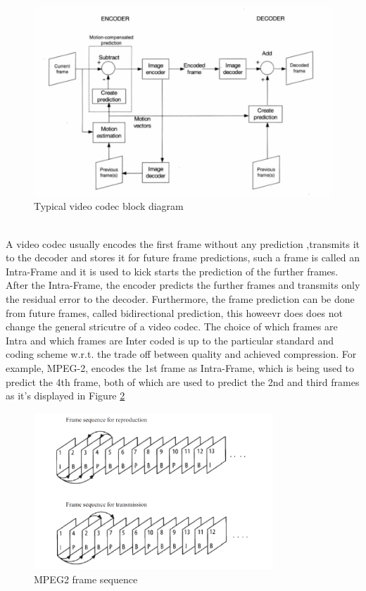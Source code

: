 \documentclass[a4paper,11pt,oneside]{article}
\begin{document}
\begin{figure}[h]
  \centering
  \includegraphics[width=\textwidth]{../figures/f1_codec_block_diagram.pdf}
  \caption{Typical video codec block diagram\cite[p.~44]{richardson2002video}}
  \label{figure:codec_block_diagram}
\end{figure} \\
A video codec usually encodes the first frame without any prediction ,transmits it to the decoder and stores it for future frame predictions, such a frame is called an Intra-Frame and it is used to kick starts the prediction of the further frames. After the Intra-Frame, the encoder predicts the further frames and transmits only the residual error to the decoder. Furthermore, the frame prediction can be done from future frames, called bidirectional prediction, this howeevr does does not change the general stricutre of a video codec. The choice of which frames are Intra and which frames are Inter coded is up to the particular standard and coding scheme w.r.t. the trade off between quality and achieved compression. For example, MPEG-2, encodes the 1st frame as Intra-Frame, which is being used to predict the 4th frame, both of which are used to predict the 2nd and third frames as it's displayed in Figure \ref{figure:mpeg2_frame_sequence} \\ 
\begin{figure}[h]
  \centering
  \includegraphics[width=0.8\textwidth]{../figures/frame_sequence_mpeg2.pdf}
  \caption{MPEG2 frame sequence \cite[p.98]{dsp_henkel}}
  \label{figure:mpeg2_frame_sequence}
\end{figure} \\
\end{document}
